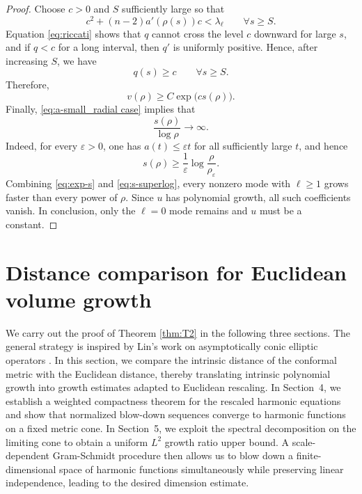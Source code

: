 \documentclass[10pt,a4paper]{amsart}
\numberwithin{equation}{section}
\begin{document}
\begin{proof}
Choose $c>0$ and $S$ sufficiently large so that
\[
 c^2+(n-2)a'(\rho(s))c<\lambda_\ell
 \qquad \forall s\ge S.
\]
Equation \cref{eq:riccati} shows that $q$ cannot cross the level $c$ downward for large $s$, and if $q<c$ for a long interval, then $q'$ is uniformly positive. Hence, after increasing $S$, we have
\[
 q(s)\ge c
 \qquad \forall s\ge S.
\]
Therefore,
\begin{equation}\label{eq:exp-s}
 v(\rho)\ge C\exp\bigl(c s(\rho)\bigr).
\end{equation}
Finally, \cref{eq:a-small_radial case} implies that
\begin{equation}\label{eq:s-superlog}
 \frac{s(\rho)}{\log\rho}\to\infty.
\end{equation}
Indeed, for every $\varepsilon>0$, one has $a(t)\le\varepsilon t$ for all sufficiently large $t$, and hence
\[
 s(\rho)\ge\frac1\varepsilon\log\frac{\rho}{\rho_\varepsilon}.
\]
Combining \cref{eq:exp-s} and \cref{eq:s-superlog}, every nonzero mode with $\ell\ge1$ grows faster than every power of $\rho$.  Since $u$ has polynomial growth, all such coefficients vanish.  
In conclusion, only the $\ell=0$ mode remains and $u$ must be a constant.
\end{proof}

\section{Distance comparison for Euclidean volume growth}

We carry out the proof of Theorem \ref{thm:T2} in the following three sections. The general strategy is inspired by Lin's work on asymptotically conic elliptic operators \cite{L}. 
In this section, we compare the intrinsic distance of the conformal metric with the Euclidean distance, thereby translating intrinsic polynomial growth into growth estimates adapted to Euclidean rescaling. 
In Section~4, we establish a weighted compactness theorem for the rescaled harmonic equations and show that normalized blow-down sequences converge to harmonic functions on a fixed metric cone.
In Section~5, we exploit the spectral decomposition  on the limiting cone to obtain a uniform $L^2$ growth ratio upper bound. A scale-dependent Gram-Schmidt procedure then allows us to blow down a finite-dimensional space of harmonic functions simultaneously while preserving linear independence, leading to the desired dimension estimate.
\end{document}
